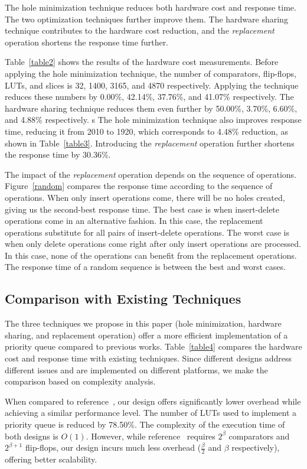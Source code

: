 \documentclass[10pt, conference, compsocconf]{IEEEtran}
\begin{document}
The hole minimization technique reduces both hardware cost and response time.
The two optimization techniques further improve them.
The hardware sharing technique contributes to the hardware cost reduction, and the {\it replacement} operation shortens the response time further.

Table~\ref{table2} shows the results of the hardware cost measurements.
Before applying the hole minimization technique, the number of comparators, flip-flops, LUTs, and slices is 32, 1400, 3165, and 4870 respectively.
Applying the technique reduces these numbers by 0.00\%, 42.14\%, 37.76\%, and 41.07\% respectively.
The hardware sharing technique reduces them even further by 50.00\%, 3.70\%, 6.60\%, and 4.88\% respectively.
s
The hole minimization technique also improves response time, reducing it from 2010 to 1920, which corresponds to 4.48\% reduction, as shown in Table~\ref{table3}.
Introducing the {\it replacement} operation further shortens the response time by 30.36\%.

The impact of the {\it replacement} operation depends on the sequence of operations.
Figure~\ref{random} compares the response time according to the sequence of operations.
When only insert operations come, there will be no holes created, giving us the second-best response time.
The best case is when insert-delete operations come in an alternative fashion.
In this case, the replacement operations substitute for all pairs of insert-delete operations.
The worst case is when only delete operations come right after only insert operations are processed.
In this case, none of the operations can benefit from the replacement operations.
The response time of a random sequence is between the best and worst cases.

\subsection{Comparison with Existing Techniques}

The three techniques we propose in this paper (hole minimization, hardware sharing, and replacement operation) offer a more efficient implementation of a priority queue compared to previous works.
Table~\ref{table4} compares the hardware cost and response time with existing techniques.
Since different designs address different issues and are implemented on different platforms, we make the comparison based on complexity analysis.

When compared to reference~\cite{hw8}, our design offers significantly lower overhead while achieving a similar performance level.
The number of LUTs used to implement a priority queue is reduced by 78.50\%.
The complexity of the execution time of both designs is $O(1)$.
However, while reference~\cite{hw8} requires $2^\beta$ comparators and $2^{\beta+1}$ flip-flops, our design incurs much less overhead ($\frac{\beta}{2}$ and $\beta$ respectively), offering better scalability.
\end{document}
